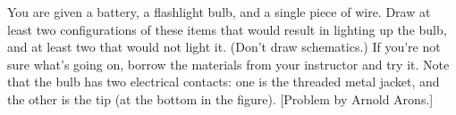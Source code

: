         You are given a battery, a flashlight bulb, and a single
        piece of wire.  Draw at least two configurations of these
        items that would result in lighting up the bulb, and at
        least two that would not light it.  (Don't draw schematics.)
         If you're not sure what's going on, borrow the materials
        from your instructor and try it. Note that the bulb has two
        electrical contacts: one is the threaded metal jacket, and
        the other is the tip (at the bottom in the figure). [Problem by Arnold Arons.]
